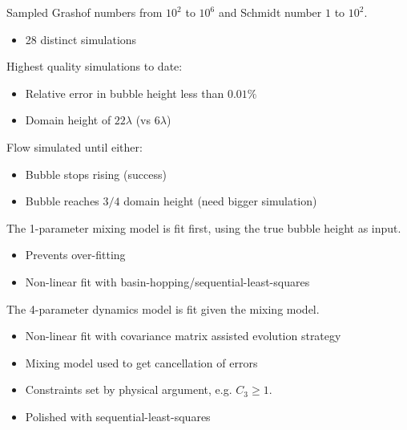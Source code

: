 \documentclass[12pt]{beamer}
\begin{document}
\begin{frame}
Sampled Grashof numbers from $10^2$ to $10^6$ and Schmidt number $1$ to $10^2$.
\begin{itemize}
  \item 28 distinct simulations
\end{itemize}
\vspace{10pt} \pause

Highest quality simulations to date:
\begin{itemize}
  \item Relative error in bubble height less than $0.01\%$
  \item Domain height of $22\lambda$ (vs $6\lambda$)
\end{itemize}
\vspace{10pt} \pause

Flow simulated until either:
\begin{itemize}
  \item Bubble stops rising (success)
  \item Bubble reaches $3/4$ domain height (need bigger simulation)
\end{itemize}
\end{frame}

\begin{frame}
The 1-parameter mixing model is fit first, using the true bubble height as input.
\begin{itemize}
  \item Prevents over-fitting
  \item Non-linear fit with basin-hopping/sequential-least-squares
\end{itemize}
\vspace{20pt} \pause

The 4-parameter dynamics model is fit given the mixing model.
\begin{itemize}
  \item Non-linear fit with covariance matrix assisted evolution strategy
  \item Mixing model used to get cancellation of errors
  \item Constraints set by physical argument, e.g. $C_3 \ge 1$.
  \item Polished with sequential-least-squares
\end{itemize}
\end{frame}

\end{document}
